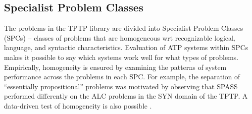 \documentclass[runningheads]{llncs}
\begin{document}
\subsection{Specialist Problem Classes}
\label{SPCs}

The problems in the TPTP library are divided into Specialist Problem Classes (SPCs) -- classes of 
problems that are homogeneous wrt recognizable logical, language, and syntactic characteristics.
Evaluation of ATP systems within SPCs makes it possible to say which systems work well for what 
types of problems. 
Empirically, homogeneity is ensured by examining the patterns of system performance across the 
problems in each SPC. 
For example, the separation of ``essentially propositional'' problems was motivated by observing 
that SPASS \cite{WA+99} performed differently on the ALC problems in the SYN domain of the TPTP.
A data-driven test of homogeneity is also possible \cite{FS02}.
\end{document}

